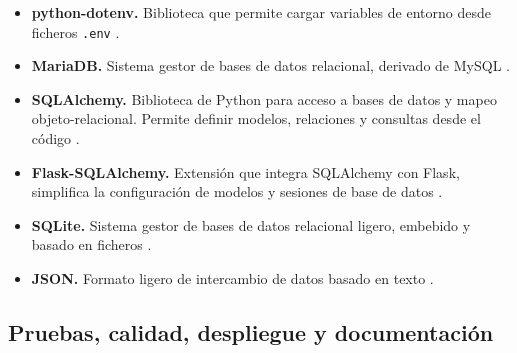 \begin{itemize}
	\item \textbf{python-dotenv.} Biblioteca que permite cargar variables de entorno desde ficheros \texttt{.env} \cite{dotenv_docs}.
	
	\item \textbf{MariaDB.} Sistema gestor de bases de datos relacional, derivado de MySQL \cite{mariadb_docs}.
	
	\item \textbf{SQLAlchemy.} Biblioteca de Python para acceso a bases de datos y mapeo objeto-relacional. Permite definir modelos, relaciones y consultas desde el código \cite{sqlalchemy_docs}.
	
	\item \textbf{Flask-SQLAlchemy.} Extensión que integra SQLAlchemy con Flask, simplifica la configuración de modelos y sesiones de base de datos \cite{sqlalchemy_docs}.
	
	\item \textbf{SQLite.} Sistema gestor de bases de datos relacional ligero, embebido y basado en ficheros \cite{sqlite_docs}.
	
	\item \textbf{JSON.} Formato ligero de intercambio de datos basado en texto \cite{json_docs}.
\end{itemize}

\subsection{Pruebas, calidad, despliegue y documentación}

